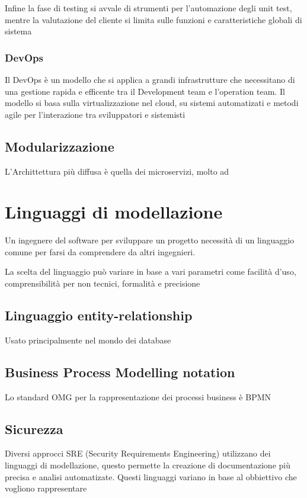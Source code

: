 \documentclass[12pt, a4paper]{article}
\begin{document}
Infine la fase di testing si avvale di strumenti per l'automazione degli unit test, mentre la valutazione del cliente
si limita sulle funzioni e caratteristiche globali di sistema

\subsubsection{DevOps}
Il DevOps è un modello che si applica a grandi infrastrutture che necessitano di una gestione rapida e efficente tra 
il Development team e l'operation team. Il modello si basa sulla virtualizzazione nel cloud, su sistemi automatizati
e metodi agile per l'interazione tra sviluppatori e sistemisti

\subsection{Modularizzazione}
L'Archittettura più diffusa è quella dei microservizi, molto ad


\newpage
\section{Linguaggi di modellazione}
Un ingegnere del software per sviluppare un progetto necessità di un linguaggio comune per farsi da comprendere
da altri ingegnieri.

La scelta del linguaggio può variare in base a vari parametri come facilità d'uso, comprensibilità per non tecnici,
formalità e precisione

\subsection{Linguaggio entity-relationship}
Usato principalmente nel mondo dei database

\subsection{Business Process Modelling notation}
Lo standard OMG per la rappresentazione dei processi business è BPMN  

\subsection{Sicurezza}
Diversi approcci SRE (Security Requirements Engineering) utilizzano dei linguaggi di modellazione, questo permette
la creazione di documentazione più precisa e analisi automatizate. Questi linguaggi variano in base al obbiettivo che
vogliono rappresentare 
\end{document}
